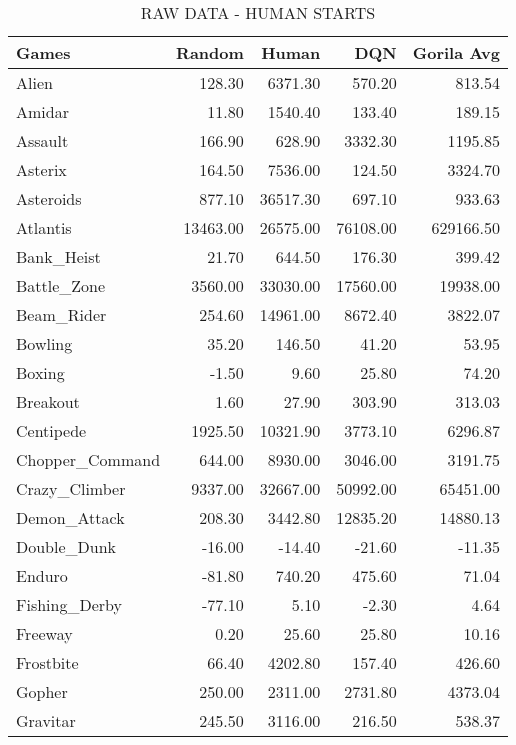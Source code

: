 \documentclass{article}
\begin{document}
\begin{table*}[h]
	\vskip 0.5in
	\caption{RAW DATA - HUMAN STARTS}
	\centering 
	\begin{tabular}{l|r|r|r|r}
		\hline \hline
		Games & Random & Human  & DQN & Gorila Avg \\
		\hline
		Alien & 128.30 & 6371.30 & 570.20 & 813.54 \\
		\hline
		Amidar & 11.80 & 1540.40 & 133.40 & 189.15 \\
		\hline
		Assault & 166.90 & 628.90 & 3332.30 & 1195.85 \\
		\hline
		Asterix & 164.50 & 7536.00 & 124.50 & 3324.70 \\
		\hline
		Asteroids & 877.10 & 36517.30 & 697.10 & 933.63 \\
		\hline
		Atlantis & 13463.00 & 26575.00 & 76108.00 & 629166.50 \\
		\hline
		Bank\_Heist & 21.70 & 644.50 & 176.30 & 399.42 \\
		\hline
		Battle\_Zone & 3560.00 & 33030.00 & 17560.00 & 19938.00\\
		\hline
		Beam\_Rider & 254.60 & 14961.00 & 8672.40 & 3822.07 \\
		\hline
		Bowling & 35.20 & 146.50 & 41.20 & 53.95 \\
		\hline
		Boxing & -1.50 & 9.60 & 25.80 & 74.20 \\
		\hline
		Breakout & 1.60 & 27.90 & 303.90 & 313.03 \\
		\hline
		Centipede & 1925.50 & 10321.90 & 3773.10 & 6296.87 \\
		\hline
		Chopper\_Command & 644.00 & 8930.00 & 3046.00 & 3191.75 \\
		\hline
		Crazy\_Climber & 9337.00 & 32667.00 & 50992.00 & 65451.00 \\
		\hline
		Demon\_Attack & 208.30 & 3442.80 & 12835.20 & 14880.13 \\
		\hline
		Double\_Dunk & -16.00 & -14.40 & -21.60 & -11.35 \\
		\hline
		Enduro & -81.80 & 740.20 & 475.60 & 71.04 \\
		\hline
		Fishing\_Derby & -77.10 & 5.10 & -2.30 & 4.64 \\
		\hline
		Freeway & 0.20 & 25.60 & 25.80 & 10.16 \\
		\hline
		Frostbite & 66.40 & 4202.80 & 157.40 & 426.60 \\
		\hline
		Gopher & 250.00 & 2311.00 & 2731.80 & 4373.04 \\
		\hline
		Gravitar & 245.50 & 3116.00 & 216.50 & 538.37 \\

\end{tabular}
\end{table*}
\end{document}
